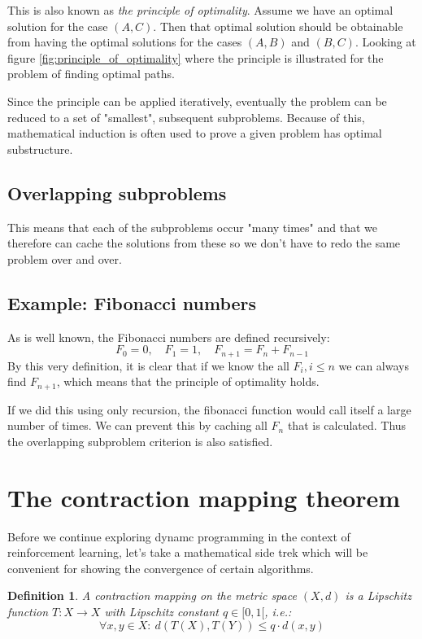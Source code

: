 \documentclass[12pt, a4paper]{article}
\newtheorem{definition}{Definition}[section]
\numberwithin{equation}{section}
\begin{document}
This is also known as \textit{the principle of optimality}. Assume we have an optimal solution for the case $(A,C)$. Then that optimal solution should be obtainable from having the optimal solutions for the cases $(A,B)$ and $(B,C)$. Looking at figure \ref{fig:principle_of_optimality} where the principle is illustrated for the problem of finding optimal paths.

Since the principle can be applied iteratively, eventually the problem can be reduced to a set of "smallest", subsequent subproblems. Because of this, mathematical induction is often used to prove a given problem has optimal substructure.

\subsection{Overlapping subproblems}
This means that each of the subproblems occur "many times" and that we therefore can cache the solutions from these so we don't have to redo the same problem over and over.

\subsection{Example: Fibonacci numbers}
As is well known, the Fibonacci numbers are defined recursively:
\begin{equation}
F_0=0,\quad F_1=1,\quad F_{n+1}=F_n+F_{n-1} 
\end{equation}
By this very definition, it is clear that if we know the all $F_i, i\le n$ we can always find $F_{n+1}$, which means that the principle of optimality holds.

If we did this using only recursion, the fibonacci function would call itself a large number of times. We can prevent this by caching all $F_n$ that is calculated. Thus the overlapping subproblem criterion is also satisfied.

\section{The contraction mapping theorem}
Before we continue exploring dynamc programming in the context of reinforcement learning, let's take a mathematical side trek which will be convenient for showing the convergence of certain algorithms.

\begin{definition}
A contraction mapping on the metric space $(X,d)$ is a Lipschitz function $T: X\rightarrow X$ with Lipschitz constant $q\in[0,1[$, i.e.:
\begin{equation}
\forall x,y\in X:\ d(T(X),T(Y))\le q\cdot d(x,y)
\end{equation}
\end{definition}
\end{document}
